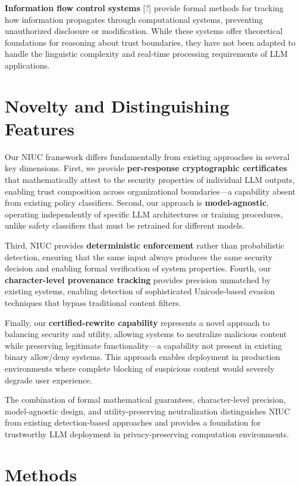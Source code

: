 \textbf{Information flow control systems} [?] provide formal methods for tracking how information propagates through computational systems, preventing unauthorized disclosure or modification. While these systems offer theoretical foundations for reasoning about trust boundaries, they have not been adapted to handle the linguistic complexity and real-time processing requirements of LLM applications.

\section{Novelty and Distinguishing Features}

Our NIUC framework differs fundamentally from existing approaches in several key dimensions. First, we provide \textbf{per-response cryptographic certificates} that mathematically attest to the security properties of individual LLM outputs, enabling trust composition across organizational boundaries—a capability absent from existing policy classifiers. Second, our approach is \textbf{model-agnostic}, operating independently of specific LLM architectures or training procedures, unlike safety classifiers that must be retrained for different models.

Third, NIUC provides \textbf{deterministic enforcement} rather than probabilistic detection, ensuring that the same input always produces the same security decision and enabling formal verification of system properties. Fourth, our \textbf{character-level provenance tracking} provides precision unmatched by existing systems, enabling detection of sophisticated Unicode-based evasion techniques that bypass traditional content filters.

Finally, our \textbf{certified-rewrite capability} represents a novel approach to balancing security and utility, allowing systems to neutralize malicious content while preserving legitimate functionality—a capability not present in existing binary allow/deny systems. This approach enables deployment in production environments where complete blocking of suspicious content would severely degrade user experience.

The combination of formal mathematical guarantees, character-level precision, model-agnostic design, and utility-preserving neutralization distinguishes NIUC from existing detection-based approaches and provides a foundation for trustworthy LLM deployment in privacy-preserving computation environments.

\section{Methods}

